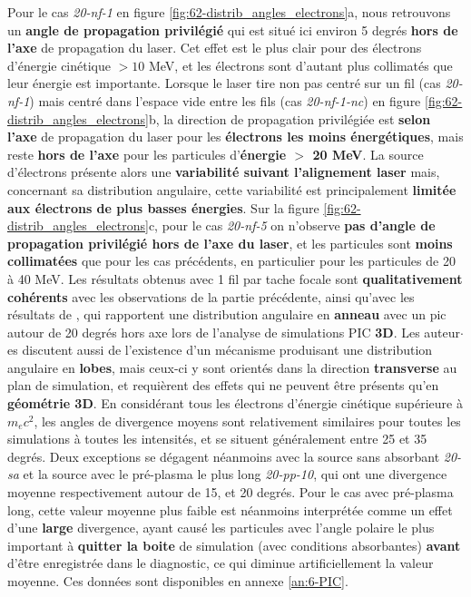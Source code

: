 \begin{refsection}
Pour le cas \textit{20-nf-1} en figure \ref{fig:62-distrib_angles_electrons}a, nous retrouvons un \textbf{angle de propagation privilégié} qui est situé ici environ 5 degrés \textbf{hors de l'axe} de propagation du laser. Cet effet est le plus clair pour des électrons d'énergie cinétique $>10$ MeV, et les électrons sont d'autant plus collimatés que leur énergie est importante. Lorsque le laser tire non pas centré sur un fil (cas \textit{20-nf-1}) mais centré dans l'espace vide entre les fils (cas \textit{20-nf-1-nc}) en figure \ref{fig:62-distrib_angles_electrons}b, la direction de propagation privilégiée est \textbf{selon l'axe} de propagation du laser pour les \textbf{électrons les moins énergétiques}, mais reste \textbf{hors de l'axe} pour les particules d'\textbf{énergie $>$ 20 MeV}. La source d'électrons présente alors une \textbf{variabilité suivant l'alignement laser} mais, concernant sa distribution angulaire, cette variabilité est principalement \textbf{limitée aux électrons de plus basses énergies}. Sur la figure \ref{fig:62-distrib_angles_electrons}c, pour le cas \textit{20-nf-5} on n'observe \textbf{pas d'angle de propagation privilégié hors de l'axe du laser}, et les particules sont \textbf{moins collimatées} que pour les cas précédents, en particulier pour les particules de 20 à 40 MeV. Les résultats obtenus avec 1 fil par tache focale sont \textbf{qualitativement cohérents} avec les observations de la partie précédente, ainsi qu'avec les résultats de \cite{fedeli_2018c}, qui rapportent une distribution angulaire en \textbf{anneau} avec un pic autour de 20 degrés hors axe lors de l'analyse de simulations PIC \textbf{3D}. Les auteur$\cdot$es \cite{jiang_2014} discutent aussi de l'existence d'un mécanisme produisant une distribution angulaire en \textbf{lobes}, mais ceux-ci y sont orientés dans la direction \textbf{transverse} au plan de simulation, et requièrent des effets qui ne peuvent être présents qu'en \textbf{géométrie 3D}. En considérant tous les électrons d'énergie cinétique supérieure à $m_e c^2$, les angles de divergence moyens sont relativement similaires pour toutes les simulations à toutes les intensités, et se situent généralement entre 25 et 35 degrés. Deux exceptions se dégagent néanmoins avec la source sans absorbant \textit{20-sa} et la source avec le pré-plasma le plus long \textit{20-pp-10}, qui ont une divergence moyenne respectivement autour de 15, et 20 degrés. Pour le cas avec pré-plasma long, cette valeur moyenne plus faible est néanmoins interprétée comme un effet d'une \textbf{large} divergence, ayant causé les particules avec l'angle polaire le plus important à \textbf{quitter la boite} de simulation (avec conditions absorbantes) \textbf{avant} d'être enregistrée dans le diagnostic, ce qui diminue artificiellement la valeur moyenne. Ces données sont disponibles en annexe \ref{an:6-PIC}.


\end{refsection}
